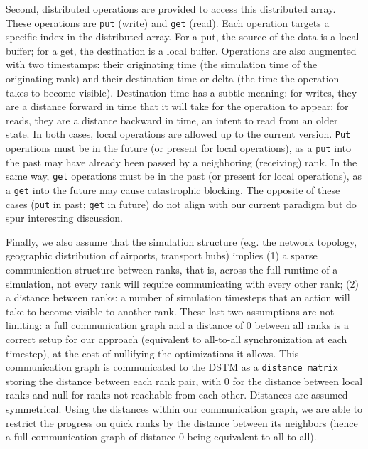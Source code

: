 Second, distributed operations are provided to access this distributed array.
These operations are \texttt{put} (write) and \texttt{get} (read). 
Each operation targets a specific index in the distributed array. For a put, the source of the data is a local buffer; for a get, the destination is a local buffer.
Operations are also augmented with two timestamps: their originating time (the simulation time of the originating rank) and their destination time or delta (the time the operation takes to become visible). 
Destination time has a subtle meaning: for writes, they are a distance forward in time that it will take for the operation to appear; for reads, they are a distance backward in time, an intent to read from an older state. 
In both cases, local operations are allowed up to the current version. \texttt{Put} operations must be in the future (or present for local operations), as a \texttt{put} into the past may have already been passed by a neighboring (receiving) rank. 
In the same way, \texttt{get} operations must be in the past (or present for local operations), as a \texttt{get} into the future may cause catastrophic blocking. 
The opposite of these cases (\texttt{put} in past; \texttt{get} in future) do not align with our current paradigm but do spur interesting discussion.

Finally, we also assume that the simulation structure (e.g. the network
topology, geographic distribution of airports, transport hubs) implies (1) a
sparse communication structure between ranks, that is, across the full runtime
of a simulation, not every rank will require communicating with every other
rank; (2) a distance between ranks: a number of simulation timesteps that an
action will take to become visible to another rank. These last two assumptions
are not limiting: a full communication graph and a distance of 0 between
all ranks is a correct setup for our approach (equivalent to all-to-all
synchronization at each timestep), at the cost of nullifying the optimizations it allows.
This communication graph is communicated to the DSTM as a \texttt{distance matrix} storing the distance between each rank pair, with 0 for the distance between local ranks and null for ranks not reachable from each other. Distances are assumed symmetrical. Using the distances within our communication graph, we are able to restrict the progress on quick ranks by the distance between its neighbors (hence a full communication graph of distance 0 being equivalent to all-to-all).

